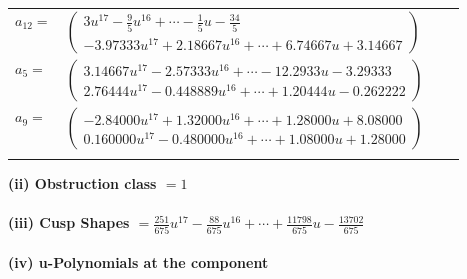 \documentclass[1p]{elsarticle_modified}
\theoremstyle{definition}
\begin{document}
\begin{tabular}{m{7pt} m{180pt} m{7pt} m{180pt} }
\flushright $a_{12}=$&$\begin{pmatrix}3 u^{17}-\frac{9}{5} u^{16}+\cdots-\frac{1}{5} u-\frac{34}{5}\\-3.97333 u^{17}+2.18667 u^{16}+\cdots+6.74667 u+3.14667\end{pmatrix}$ \\
\flushright $a_{5}=$&$\begin{pmatrix}3.14667 u^{17}-2.57333 u^{16}+\cdots-12.2933 u-3.29333\\2.76444 u^{17}-0.448889 u^{16}+\cdots+1.20444 u-0.262222\end{pmatrix}$ \\
\flushright $a_{9}=$&$\begin{pmatrix}-2.84000 u^{17}+1.32000 u^{16}+\cdots+1.28000 u+8.08000\\0.160000 u^{17}-0.480000 u^{16}+\cdots+1.08000 u+1.28000\end{pmatrix}$\\&\end{tabular}
\flushleft \textbf{(ii) Obstruction class $= 1$}\\~\\
\flushleft \textbf{(iii) Cusp Shapes $= \frac{251}{675} u^{17}-\frac{88}{675} u^{16}+\cdots+\frac{11798}{675} u-\frac{13702}{675}$}\\~\\
\newpage\renewcommand{\arraystretch}{1}
\flushleft \textbf{(iv) u-Polynomials at the component}\newline \\
\end{document}
